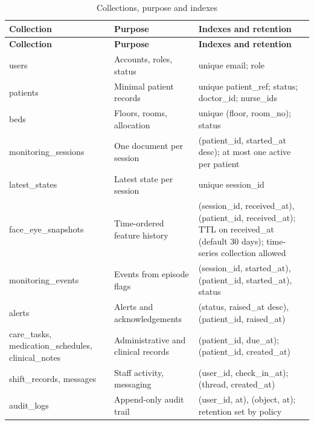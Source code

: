 \documentclass[a4paper,11pt]{scrreprt}
\begin{document}
\begin{longtable}{@{}>{\ttfamily\footnotesize}p{3.4cm}>{\raggedright\arraybackslash}p{5.4cm}>{\raggedright\arraybackslash}p{5.8cm}@{}}
\caption{Collections, purpose and indexes}\label{tab:collections}\\
\toprule \textbf{Collection} & \textbf{Purpose} & \textbf{Indexes and retention}\\ \midrule \endfirsthead
\toprule \textbf{Collection} & \textbf{Purpose} & \textbf{Indexes and retention}\\ \midrule \endhead
\bottomrule \endfoot
users & Accounts, roles, status & unique email; role\\ \midrule
patients & Minimal patient records & unique patient_ref; status; doctor_id; nurse_ids\\ \midrule
beds & Floors, rooms, allocation & unique (floor, room_no); status\\ \midrule
monitoring_sessions & One document per session & (patient_id, started_at desc); at most one active per patient\\ \midrule
latest_states & Latest state per session & unique session_id\\ \midrule
face_eye_snapshots & Time-ordered feature history & (session_id, received_at), (patient_id, received_at); TTL on received_at (default 30 days); time-series collection allowed\\ \midrule
monitoring_events & Events from episode flags & (session_id, started_at), (patient_id, started_at), status\\ \midrule
alerts & Alerts and acknowledgements & (status, raised_at desc), (patient_id, raised_at)\\ \midrule
care_tasks, medication_schedules, clinical_notes & Administrative and clinical records & (patient_id, due_at); (patient_id, created_at)\\ \midrule
shift_records, messages & Staff activity, messaging & (user_id, check_in_at); (thread, created_at)\\ \midrule
audit_logs & Append-only audit trail & (user_id, at), (object, at); retention set by policy\\
\end{longtable}
\end{document}
